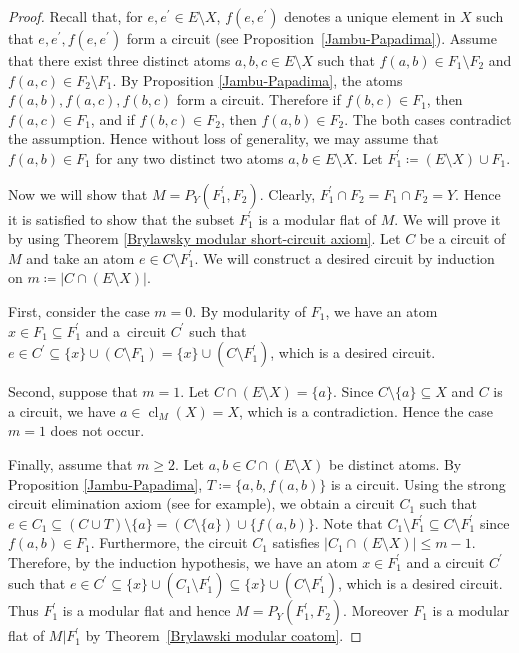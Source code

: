 \documentclass[pdftex]{sigma}
\numberwithin{equation}{section}
\DeclareMathOperator{\cl}{cl}
\begin{document}
\begin{proof}
Recall that, for $ e,e^{\prime} \in E\setminus X $, $ f(e,e^{\prime}) $ denotes a unique element in $ X $ such that $ e,e^{\prime},f(e,e^{\prime}) $ form a circuit (see Proposition~\ref{Jambu-Papadima}).
Assume that there exist three distinct atoms $ a,b,c \in E\setminus X $ such that $ f(a,b) \in F_{1}\setminus F_{2} $ and $ f(a,c) \in F_{2}\setminus F_{1} $.
By Proposition \ref{Jambu-Papadima}, the atoms $ f(a,b),f(a,c),f(b,c) $ form a circuit.
Therefore if $ f(b,c) \in F_{1} $, then $ f(a,c) \in F_{1} $, and if $ f(b,c) \in F_{2} $, then $ f(a,b) \in F_{2} $.
The both cases contradict the assumption.
Hence without loss of generality, we may assume that $ f(a,b) \in F_{1} $ for any two distinct two atoms $ a,b \in E\setminus X $.
Let $ F_{1}^{\prime} \coloneqq (E\setminus X) \cup F_{1} $.

Now we will show that $ M = P_{Y}(F_{1}^{\prime}, F_{2}) $.
Clearly, $ F_{1}^{\prime} \cap F_{2} = F_{1} \cap F_{2} = Y $.
Hence it is satisfied to show that the subset $ F_{1}^{\prime} $ is a modular flat of $ M $.
We will prove it by using Theorem \ref{Brylawsky modular short-circuit axiom}.
Let $ C $ be a circuit of $ M $ and take an atom $ e \in C \setminus F_{1}^{\prime} $.
We will construct a desired circuit by induction on $ m \coloneqq |C \cap (E\setminus X)| $.

First, consider the case $ m=0 $.
By modularity of $ F_{1} $, we have an atom $ x \in F_{1} \subseteq F_{1}^{\prime} $ and a~circuit $ C^{\prime} $ such that $ e \in C^{\prime} \subseteq \{x\} \cup (C\setminus F_{1}) = \{x\} \cup (C\setminus F_{1}^{\prime}) $, which is a desired circuit.

Second, suppose that $ m=1 $.
Let $ C \cap (E\setminus X) = \{a\} $.
Since $ C\setminus \{a\} \subseteq X $ and $ C $ is a circuit, we have $ a \in \cl_{M}(X) = X $, which is a contradiction.
Hence the case $ m=1 $ does not occur.

Finally, assume that $ m \geq 2 $.
Let $ a,b \in C \cap (E\setminus X) $ be distinct atoms.
By Proposition \ref{Jambu-Papadima}, $ T \coloneqq \{a,b,f(a,b)\} $ is a circuit.
Using the strong circuit elimination axiom (see \cite[Proposition~1.4.12]{oxley2011matroid} for example), we obtain a circuit $ C_{1} $ such that $ e \in C_{1} \subseteq (C \cup T)\setminus \{a\} = (C\setminus \{a\}) \cup \{f(a,b)\} $.
Note that $ C_{1}\setminus F_{1}^{\prime} \subseteq C\setminus F_{1}^{\prime} $ since $ f(a,b) \in F_{1} $.
Furthermore, the circuit $ C_{1} $ satisfies $ |C_{1}\cap (E\setminus X)| \leq m-1 $.
Therefore, by the induction hypothesis, we have an atom $ x \in F_{1}^{\prime} $ and a circuit $ C^{\prime} $ such that $ e \in C^{\prime} \subseteq \{x\} \cup (C_{1}\setminus F_{1}^{\prime}) \subseteq \{x\} \cup (C \setminus F_{1}^{\prime}) $, which is a desired circuit.
Thus $ F_{1}^{\prime} $ is a modular flat and hence $ M=P_{Y}(F_{1}^{\prime}, F_{2}) $.
Moreover $ F_{1} $ is a modular flat of $ M|F_{1}^{\prime} $ by Theorem~\ref{Brylawski modular coatom}.
\end{proof}
\end{document}
